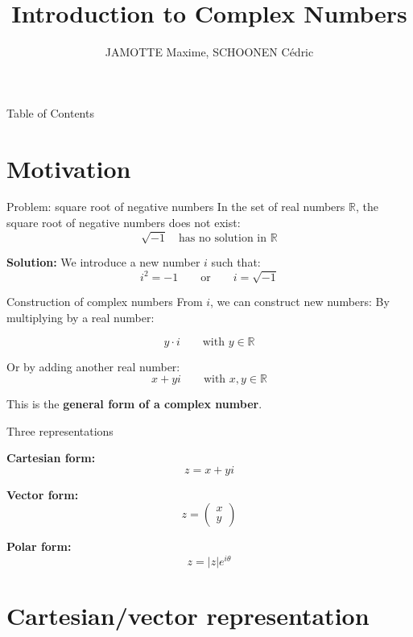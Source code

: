 \documentclass[aspectratio=169,12pt]{beamer}
\title{Introduction to Complex Numbers}
\author{JAMOTTE Maxime, SCHOONEN Cédric}
\institute{Digital Learning Hub}
\date{}
\begin{document}
\begin{frame}
  \titlepage
\end{frame}

\begin{frame}{Table of Contents}
  \tableofcontents
\end{frame}

\section{Motivation}

\begin{frame}{Problem: square root of negative numbers}
  In the set of real numbers $\mathbb{R}$, the square root of negative numbers does not exist:
  \[
    \sqrt{-1} \quad \text{has no solution in } \mathbb{R}
  \]
  
  \bigskip
  \textbf{Solution:} We introduce a new number $i$ such that:
  \[
    i^2 = -1 \qquad \text{or} \qquad i = \sqrt{-1}
  \]
\end{frame}

\begin{frame}{Construction of complex numbers}
  From $i$, we can construct new numbers: By multiplying by a real number:
  
  \[
    y \cdot i \qquad \text{with } y \in \mathbb{R}
  \]
  
  \bigskip
  Or by adding another real number:
  \[
    x + yi \qquad \text{with } x, y \in \mathbb{R}
  \]
  
  \bigskip
  This is the \textbf{general form of a complex number}.
\end{frame}

\begin{frame}{Three representations}
  
  \bigskip
  \textbf{Cartesian form:}
  \[
    z = x + yi
  \]
  
  \textbf{Vector form:}
  \[
    z = \begin{pmatrix} x \\ y \end{pmatrix}
  \]
  
  \textbf{Polar form:}
  \[
    z = |z| e^{i\theta}
  \]
\end{frame}

\section{Cartesian/vector representation}
\end{document}
